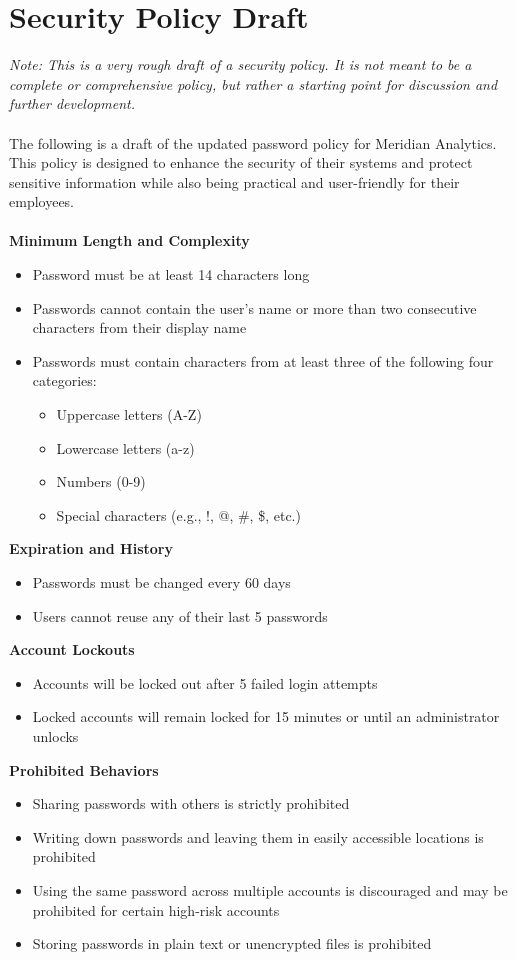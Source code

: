 \documentclass[12pt]{article}
\begin{document}
\newpage
\section{Security Policy Draft}
\textit{Note: This is a very rough draft of a security policy. It is not meant to be a complete or comprehensive policy, but rather a starting point for discussion and further development.}\\
\ \\
The following is a draft of the updated password policy for Meridian Analytics. This policy is designed to enhance the security of their systems and protect sensitive information while also being practical and user-friendly for their employees.\\
\ \\
\textbf{Minimum Length and Complexity}
\begin{itemize}
	\item Password must be at least 14 characters long
	\item Passwords cannot contain the user's name or more than two consecutive characters from their display name
	\item Passwords must contain characters from at least three of the following four categories:
	\begin{itemize}
		\item Uppercase letters (A-Z)
		\item Lowercase letters (a-z)
		\item Numbers (0-9)
		\item Special characters (e.g., !, @, \#, \$, etc.)
	\end{itemize}
\end{itemize}
\textbf{Expiration and History}
\begin{itemize}
	\item Passwords must be changed every 60 days
	\item Users cannot reuse any of their last 5 passwords
\end{itemize}
\newpage  %
\noindent\textbf{Account Lockouts}
\begin{itemize}
	\item Accounts will be locked out after 5 failed login attempts
	\item Locked accounts will remain locked for 15 minutes or until an administrator unlocks
\end{itemize}
\textbf{Prohibited Behaviors}
\begin{itemize}
	\item Sharing passwords with others is strictly prohibited
	\item Writing down passwords and leaving them in easily accessible locations is prohibited
	\item Using the same password across multiple accounts is discouraged and may be prohibited for certain high-risk accounts
	\item Storing passwords in plain text or unencrypted files is prohibited
\end{itemize}
\end{document}
